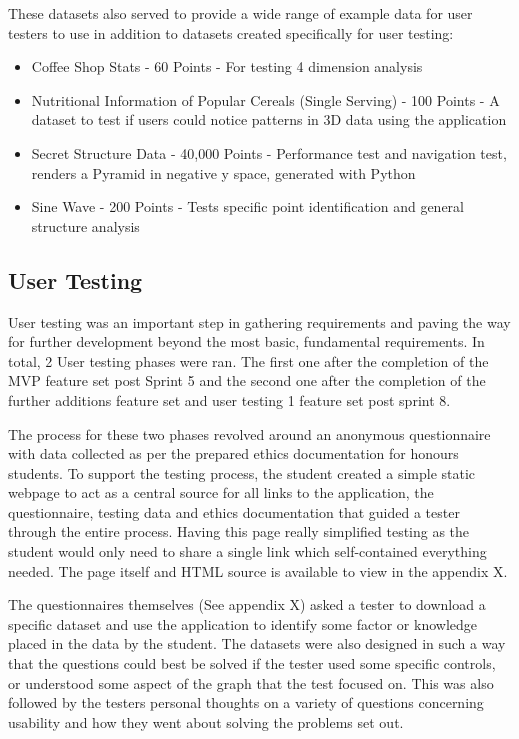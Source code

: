 These datasets also served to provide a wide range of example data for user testers to use in addition to datasets created specifically for user testing:
\begin{itemize}
    \item Coffee Shop Stats - 60 Points - For testing 4 dimension analysis
    \item Nutritional Information of Popular Cereals (Single Serving) - 100 Points - A dataset to test if users could notice patterns in 3D data using the application
    \item Secret Structure Data - 40,000 Points - Performance test and navigation test, renders a Pyramid in negative y space, generated with Python
    \item Sine Wave - 200 Points - Tests specific point identification and general structure analysis
\end{itemize}

\subsection{User Testing} \label{usertest1}
User testing was an important step in gathering requirements and paving the way for further development beyond the most basic, fundamental requirements. In total, 2 User testing phases were ran. The first one after the completion of the MVP feature set post Sprint 5 and the second one after the completion of the further additions feature set and user testing 1 feature set post sprint 8.

The process for these two phases revolved around an anonymous questionnaire with data collected as per the prepared ethics documentation for honours students.
To support the testing process, the student created a simple static webpage to act as a central source for all links to the application, the questionnaire, testing data and ethics documentation that guided a tester through the entire process. Having this page really simplified testing as the student would only need to share a single link which self-contained everything needed. The page itself and HTML source is available to view in the appendix X.

The questionnaires themselves (See appendix X) asked a tester to download a specific dataset and use the application to identify some factor or knowledge placed in the data by the student. The datasets were also designed in such a way that the questions could best be solved if the tester used some specific controls, or understood some aspect of the graph that the test focused on. This was also followed by the testers personal thoughts on a variety of questions concerning usability and how they went about solving the problems set out.

